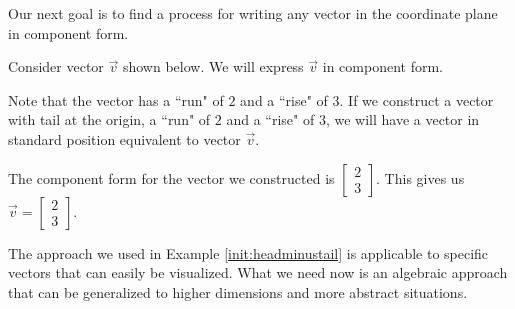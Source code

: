 \documentclass{ximera}
\begin{document}
Our next goal is to find a process for writing any vector in the coordinate plane in component form.  
\begin{example}\label{init:headminustail}
Consider vector $\vec{v}$ shown below.  We will express $\vec{v}$ in component form.

\begin{center}
\end{center}
\begin{explanation}
Note that the vector has a ``run" of $2$ and a ``rise" of $3$.  If we construct a vector with tail at the origin, a ``run" of $2$ and a ``rise" of $3$, we will have a vector in standard position equivalent to vector $\vec{v}$.
\begin{center}
\end{center}
The component form for the vector we constructed is $\begin{bmatrix}2\\3\end{bmatrix}$.  This gives us $\vec{v}=\begin{bmatrix}2\\3\end{bmatrix}$.
\end{explanation}
\end{example}
The approach we used in Example \ref{init:headminustail} is applicable to specific vectors that can easily be visualized.  What we need now is an algebraic approach that can be generalized to higher dimensions and more abstract situations.  
\end{document}
